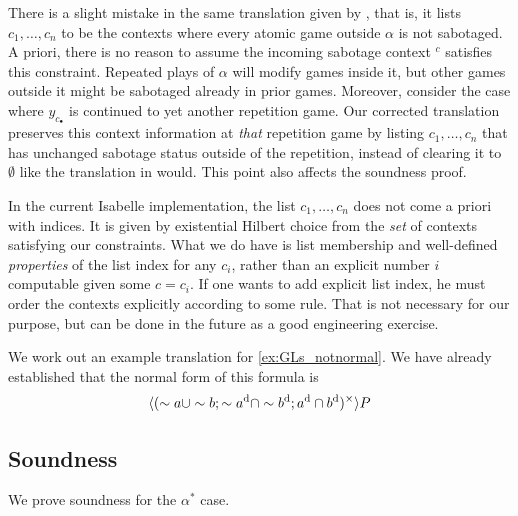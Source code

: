 There is a slight mistake in the same translation given by \cite{Wafa_2024}, that is, it lists $c_1,\dots,c_n$ to be the contexts where every atomic game outside $\alpha$ is not sabotaged. A priori, there is no reason to assume the incoming sabotage context $^c$ satisfies this constraint. Repeated plays of $\alpha$ will modify games inside it, but other games outside it might be sabotaged already in prior games. Moreover, consider the case where $y_{c_\bullet}$ is continued to yet another repetition game. Our corrected translation preserves this context information at \textit{that} repetition game by listing $c_1,\dots,c_n$ that has unchanged sabotage status outside of the repetition, instead of clearing it to $\emptyset$ like the translation in  \cite{Wafa_2024} would. This point also affects the soundness proof.

\begin{remark}
    In the current Isabelle implementation, the list $c_1,\dots,c_n$ does not come a priori with indices. It is given by existential Hilbert choice from the \textit{set} of contexts satisfying our constraints. What we do have is list membership and well-defined \textit{properties} of the list index for any $c_i$, rather than an explicit number $i$ computable given some $c = c_i$. If one wants to add explicit list index, he must order the contexts explicitly according to some rule. That is not necessary for our purpose, but can be done in the future as a good engineering exercise.
\end{remark}

\begin{example}
    We work out an example translation for \autoref{ex:GLs_notnormal}. We have already established that the normal form of this formula is
    \[\langle(\sim a \cup \sim b ; \sim a^\text{d}\cap \sim b^\text{d}; a^\text{d}\cap b^\text{d})^\times\rangle P\]

    
\end{example}

\subsection{Soundness}
We prove soundness for the $\alpha^*$ case. 


